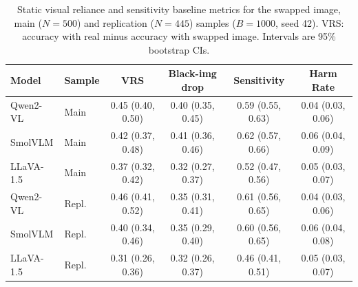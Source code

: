 \begin{table}[t]
\centering
\caption{Static visual reliance and sensitivity baseline metrics for the
  swapped image, main ($N=500$) and replication ($N=445$) samples
  ($B=1000$, seed 42). VRS: accuracy with real minus accuracy with
  swapped image. Intervals are 95\% bootstrap CIs.}
\label{tab:baseline}
\begin{tabular}{llcccc}
\toprule
\textbf{Model} & \textbf{Sample} & VRS & Black-img drop & Sensitivity & Harm Rate \\
\midrule
Qwen2-VL  & Main  & 0.45 (0.40, 0.50) & 0.40 (0.35, 0.45) & 0.59 (0.55, 0.63) & 0.04 (0.03, 0.06) \\
SmolVLM   & Main  & 0.42 (0.37, 0.48) & 0.41 (0.36, 0.46) & 0.62 (0.57, 0.66) & 0.06 (0.04, 0.09) \\
LLaVA-1.5 & Main  & 0.37 (0.32, 0.42) & 0.32 (0.27, 0.37) & 0.52 (0.47, 0.56) & 0.05 (0.03, 0.07) \\
Qwen2-VL  & Repl. & 0.46 (0.41, 0.52) & 0.35 (0.31, 0.41) & 0.61 (0.56, 0.65) & 0.04 (0.03, 0.06) \\
SmolVLM   & Repl. & 0.40 (0.34, 0.46) & 0.35 (0.29, 0.40) & 0.60 (0.56, 0.65) & 0.06 (0.04, 0.08) \\
LLaVA-1.5 & Repl. & 0.31 (0.26, 0.36) & 0.32 (0.26, 0.37) & 0.46 (0.41, 0.51) & 0.05 (0.03, 0.07) \\
\bottomrule
\end{tabular}
\end{table}
